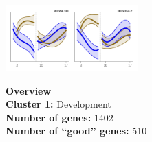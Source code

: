 \begin{multicols}{2}
\includegraphics[width=2in]{figures/clusters/root_Preflowering_0.png}
\columnbreak

\noindent \textbf{Overview}\\\textbf{Cluster 1:} Development \\
\textbf{Number of genes:} 1402 \\
\textbf{Number of ``good'' genes:} 510 \\
\end{multicols}

